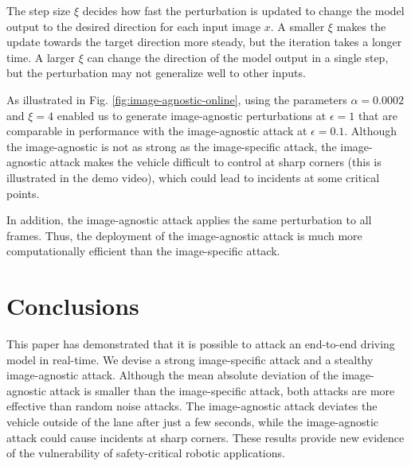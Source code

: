 The step size $\xi$ decides how fast the perturbation is updated to change the model output to the desired direction for each input image $x$. A smaller $\xi$ makes the update towards the target direction more steady, but the iteration takes a longer time. A larger $\xi$ can change the direction of the model output in a single step, but the perturbation may not generalize well to other inputs.

As illustrated in Fig. \ref{fig:image-agnostic-online}, using the parameters $\alpha=0.0002$ and $\xi=4$ enabled us to generate image-agnostic perturbations at $\epsilon=1$ that are comparable in performance with the image-agnostic attack at $\epsilon=0.1$. Although the image-agnostic is not as strong as the image-specific attack, the image-agnostic attack makes the vehicle difficult to control at sharp corners (this is illustrated in the demo video), which could lead to incidents at some critical points. 

In addition, the image-agnostic attack applies the same perturbation to all frames. Thus, the deployment of the image-agnostic attack is much more computationally efficient than the image-specific attack.




\section{Conclusions}

This paper has demonstrated that it is possible to attack an end-to-end driving model in real-time. We devise a strong image-specific attack and a stealthy image-agnostic attack. Although the mean absolute deviation of the image-agnostic attack is smaller than the image-specific attack, both attacks are more effective than random noise attacks. The image-agnostic attack deviates the vehicle outside of the lane after just a few seconds, while the image-agnostic attack could cause incidents at sharp corners. These results provide new evidence of the vulnerability of safety-critical robotic applications.



